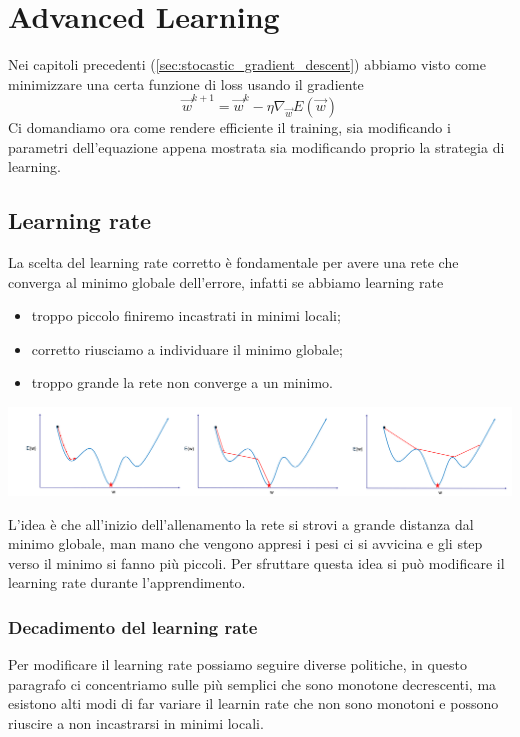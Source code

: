 \chapter{Advanced Learning}
Nei capitoli precedenti (\ref{sec:stocastic_gradient_descent}) abbiamo visto come minimizzare una certa funzione di loss usando il gradiente
\begin{equation}
	\vec{w}^{k+1} = \vec{w}^k - \eta \nabla_{\vec{w}} E(\vec{w})
\end{equation}
Ci domandiamo ora come rendere efficiente il training, sia modificando i parametri dell'equazione appena mostrata sia modificando proprio la strategia di learning.

\section{Learning rate}
La scelta del learning rate corretto è fondamentale per avere una rete che converga al minimo globale dell'errore, infatti se abbiamo learning rate
\begin{multicols}{3}
	\begin{itemize}
		\item troppo piccolo finiremo incastrati in minimi locali;
		\item corretto riusciamo a individuare il minimo globale;
		\item troppo grande la rete non converge a un minimo.
	\end{itemize}
\end{multicols}
\begin{center}
	\includegraphics[width=\linewidth]{Picture/Learning_Rate}
\end{center}

L'idea è che all'inizio dell'allenamento la rete si strovi a grande distanza dal minimo globale, man mano che vengono appresi i pesi ci si avvicina e gli step verso il minimo si fanno più piccoli. Per sfruttare questa idea si può modificare il learning rate durante l'apprendimento.

\subsection{Decadimento del learning rate}
Per modificare il learning rate possiamo seguire diverse politiche, in questo paragrafo ci concentriamo sulle più semplici che sono monotone decrescenti, ma esistono alti modi di far variare il learnin rate che non sono monotoni e possono riuscire a non incastrarsi in minimi locali.
